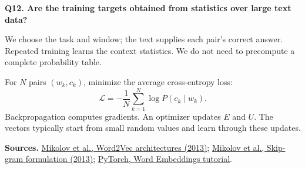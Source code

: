 \documentclass[11pt,a4paper]{article}
\newcommand{\qa}[2]{%
  \par\addvspace{8pt}\noindent\textbf{#1}\par\nobreak
  \noindent #2\par}
\begin{document}
\qa{Q12. Are the training targets obtained from statistics over large text data?}{
We choose the task and window; the text supplies each pair's correct answer.
Repeated training learns the context statistics.
We do not need to precompute a complete probability table.}

For $N$ pairs $(w_k,c_k)$, minimize the average cross-entropy loss:
\[
\mathcal{L}=-\frac{1}{N}\sum_{k=1}^{N}\log P(c_k\mid w_k).
\]
Backpropagation computes gradients. An optimizer updates $E$ and $U$.
The vectors typically start from small random values and learn through these updates.

\medskip
{\small\color{quiet}
\textbf{Sources.}
\href{https://arxiv.org/abs/1301.3781}{Mikolov et al., Word2Vec architectures (2013)};
\href{https://arxiv.org/abs/1310.4546}{Mikolov et al., Skip-gram formulation (2013)};
\href{https://docs.pytorch.org/tutorials/beginner/nlp/word_embeddings_tutorial.html}{PyTorch, Word Embeddings tutorial}.
}
\end{document}
